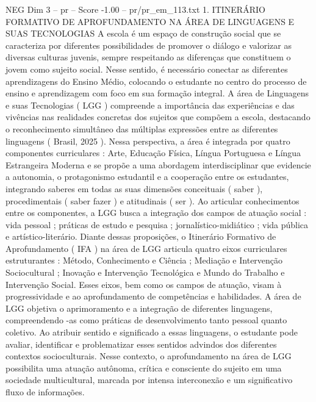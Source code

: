 \begin{textsample}{NEG Dim 3 – pr – Score -1.00 – pr/pr\_em\_113.txt}  \label{ex:f3_neg_137}
1.
ITINERÁRIO FORMATIVO DE APROFUNDAMENTO NA ÁREA DE LINGUAGENS E SUAS TECNOLOGIAS A escola é um espaço de construção social que se caracteriza por diferentes possibilidades de promover o diálogo e valorizar as diversas culturas juvenis, sempre respeitando as diferenças que constituem o jovem como sujeito social.
Nesse sentido, é necessário conectar as diferentes aprendizagens do Ensino Médio, colocando o estudante no centro do processo de ensino e aprendizagem com foco em sua formação integral.
A área de Linguagens e suas Tecnologias ( LGG ) compreende a importância das experiências e das vivências nas realidades concretas dos sujeitos que compõem a escola, destacando o reconhecimento simultâneo das múltiplas expressões entre as diferentes linguagens ( Brasil, 2025 ).
Nessa perspectiva, a área é integrada por quatro componentes curriculares : Arte, Educação Física, Língua Portuguesa e Língua Estrangeira Moderna e se propõe a uma abordagem interdisciplinar que evidencie a autonomia, o protagonismo estudantil e a cooperação entre os estudantes, integrando saberes em todas as suas dimensões conceituais ( saber ), procedimentais ( saber fazer ) e atitudinais ( ser ).
Ao articular conhecimentos entre os componentes, a LGG busca a integração dos campos de atuação social : vida pessoal ; práticas de estudo e pesquisa ; jornalístico-midiático ; vida pública e artístico-literário.
Diante dessas proposições, o Itinerário Formativo de Aprofundamento ( IFA ) na área de LGG articula quatro eixos curriculares estruturantes : Método, Conhecimento e Ciência ; Mediação e Intervenção Sociocultural ; Inovação e Intervenção Tecnológica e Mundo do Trabalho e Intervenção Social.
Esses eixos, bem como os campos de atuação, visam à progressividade e ao aprofundamento de competências e habilidades.
A área de LGG objetiva o aprimoramento e a integração de diferentes linguagens, compreendendo -as como práticas de desenvolvimento tanto pessoal quanto coletivo.
Ao atribuir sentido e significado a essas linguagens, o estudante pode avaliar, identificar e problematizar esses sentidos advindos dos diferentes contextos socioculturais.
Nesse contexto, o aprofundamento na área de LGG possibilita uma atuação autônoma, crítica e consciente do sujeito em uma sociedade multicultural, marcada por intensa interconexão e um significativo fluxo de informações.

\end{textsample}
